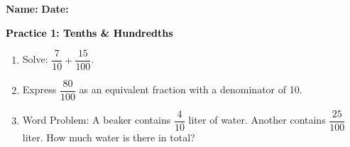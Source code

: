 \documentclass[12pt, letterpaper, fleqn]{article}
\begin{document}
\textbf{Name:} \underline{\hspace{5cm}}
\hfill
\textbf{Date:} \underline{\hspace{3cm}}\\

\begin{tcolorbox}[colback=customteal!20]
    \large\textcolor{black}{\textbf{Practice 1: Tenths & Hundredths}}
\end{tcolorbox}
\begin{enumerate}[itemsep=3.5cm, leftmargin=0.6cm]
\item Solve: $\dfrac{7}{10} + \dfrac{15}{100}$.
\vspace{3.5cm}
\item Express $\dfrac{80}{100}$ as an equivalent fraction with a denominator of 10.
\vspace{3.5cm}
\item Word Problem: A beaker contains $\dfrac{4}{10}$ liter of water. Another contains $\dfrac{25}{100}$ liter. How much water is there in total?
\end{enumerate}
\end{document}

